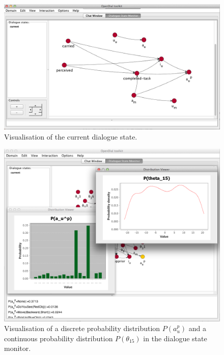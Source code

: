 \begin{figure}[p!] 
\begin{center}
\includegraphics[scale=0.40]{imgs/gui-bn.png}
\end{center} 
\caption{Visualisation of the current dialogue state.}
\label{fig:gui-bn}
\end{figure}

\begin{figure}[p!] 
\begin{center}
\includegraphics[scale=0.40]{imgs/gui-distribviewer.png}
\end{center} 
\caption{Visualisation of a discrete probability distribution $P(a_u^p)$ and a continuous probability distribution $P(\theta_{15})$ in the dialogue state monitor.}
\label{fig:gui-distribviewer}
\end{figure}

